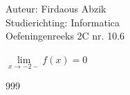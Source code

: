 \documentclass[a4paper]{article}
\begin{document}
\noindent \large Auteur: Firdaous Abzik\\
\noindent \large Studierichting: Informatica\\
\noindent \large Oefeningenreeks 2C nr. 10.6\\

\medskip

\normalsize


$ \lim\limits_{x \to - 2-} f(x) = 0$

\begin{thebibliography}{999}
\end{thebibliography}
\end{document}
